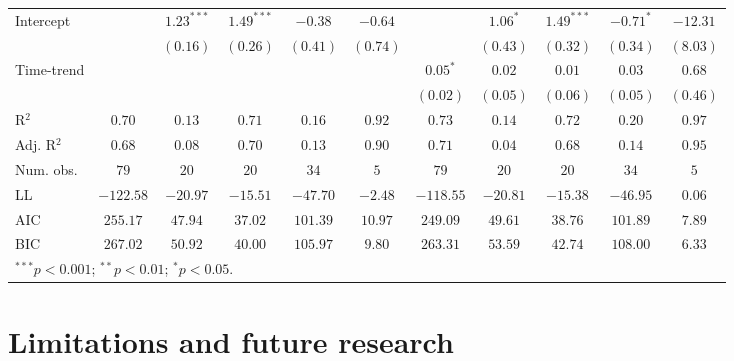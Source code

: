 \documentclass[a4paper]{article}\usepackage[]{graphicx}\usepackage[]{xcolor}
\begin{document}
\begin{table}
\begin{center}
{\begin{tabular}{l c c c c c c c c c c}
Intercept       &             & $1.23^{***}$ & $1.49^{***}$  & $-0.38$      & $-0.64$  &               & $1.06^{*}$  & $1.49^{***}$ & $-0.71^{*}$  & $-12.31$    \\
                &             & $(0.16)$     & $(0.26)$      & $(0.41)$     & $(0.74)$ &               & $(0.43)$    & $(0.32)$     & $(0.34)$     & $(8.03)$    \\
Time-trend      &             &              &               &              &          & $0.05^{*}$    & $0.02$      & $0.01$       & $0.03$       & $0.68$      \\
                &             &              &               &              &          & $(0.02)$      & $(0.05)$    & $(0.06)$     & $(0.05)$     & $(0.46)$    \\
\midrule
R$^2$           & $0.70$      & $0.13$       & $0.71$        & $0.16$       & $0.92$   & $0.73$        & $0.14$      & $0.72$       & $0.20$       & $0.97$      \\
Adj. R$^2$      & $0.68$      & $0.08$       & $0.70$        & $0.13$       & $0.90$   & $0.71$        & $0.04$      & $0.68$       & $0.14$       & $0.95$      \\
Num. obs.       & $79$        & $20$         & $20$          & $34$         & $5$      & $79$          & $20$        & $20$         & $34$         & $5$         \\
LL              & $-122.58$   & $-20.97$     & $-15.51$      & $-47.70$     & $-2.48$  & $-118.55$     & $-20.81$    & $-15.38$     & $-46.95$     & $0.06$      \\
AIC             & $255.17$    & $47.94$      & $37.02$       & $101.39$     & $10.97$  & $249.09$      & $49.61$     & $38.76$      & $101.89$     & $7.89$      \\
BIC             & $267.02$    & $50.92$      & $40.00$       & $105.97$     & $9.80$   & $263.31$      & $53.59$     & $42.74$      & $108.00$     & $6.33$      \\
\bottomrule
\multicolumn{11}{l}{\scriptsize{$^{***}p<0.001$; $^{**}p<0.01$; $^{*}p<0.05$.}}
\end{tabular}
}
\label{tab:time_trend}
\end{center}
\end{table}


\section{Limitations and future research}
\end{document}
